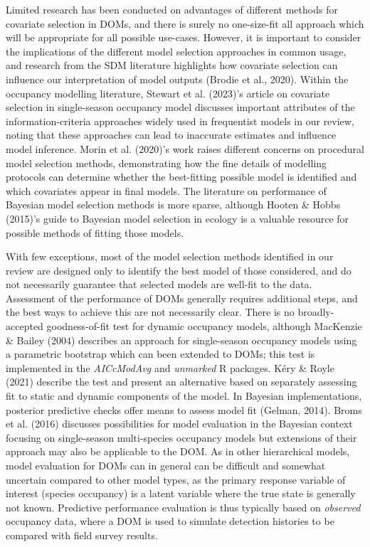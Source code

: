 \documentclass[
]{article}
\begin{document}
Limited research has been conducted on advantages of different methods
for covariate selection in DOMs, and there is surely no one-size-fit all
approach which will be appropriate for all possible use-cases. However,
it is important to consider the implications of the different model
selection approaches in common usage, and research from the SDM
literature highlights how covariate selection can influence our
interpretation of model outputs (Brodie et al., 2020). Within the
occupancy modelling literature, Stewart et al. (2023)'s article on
covariate selection in single-season occupancy model discusses important
attributes of the information-criteria approaches widely used in
frequentist models in our review, noting that these approaches can lead
to inaccurate estimates and influence model inference. Morin et al.
(2020)'s work raises different concerns on procedural model selection
methods, demonstrating how the fine details of modelling protocols can
determine whether the best-fitting possible model is identified and
which covariates appear in final models. The literature on performance
of Bayesian model selection methods is more sparse, although Hooten \&
Hobbs (2015)'s guide to Bayesian model selection in ecology is a
valuable resource for possible methods of fitting those models.

With few exceptions, most of the model selection methods identified in
our review are designed only to identify the best model of those
considered, and do not necessarily guarantee that selected models are
well-fit to the data. Assessment of the performance of DOMs generally
requires additional steps, and the best ways to achieve this are not
necessarily clear. There is no broadly-accepted goodness-of-fit test for
dynamic occupancy models, although MacKenzie \& Bailey (2004) describes
an approach for single-season occupancy models using a parametric
bootstrap which can been extended to DOMs; this test is implemented in
the \emph{AICcModAvg} and \emph{unmarked} R packages. Kéry \& Royle
(2021) describe the test and present an alternative based on separately
assessing fit to static and dynamic components of the model. In Bayesian
implementations, posterior predictive checks offer means to assess model
fit (Gelman, 2014). Broms et al. (2016) discusses possibilities for
model evaluation in the Bayesian context focusing on single-season
multi-species occupancy models but extensions of their approach may also
be applicable to the DOM. As in other hierarchical models, model
evaluation for DOMs can in general can be difficult and somewhat
uncertain compared to other model types, as the primary response
variable of interest (species occupancy) is a latent variable where the
true state is generally not known. Predictive performance evaluation is
thus typically based on \emph{observed} occupancy data, where a DOM is
used to simulate detection histories to be compared with field survey
results.
\end{document}
